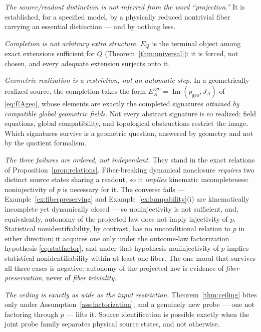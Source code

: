 \documentclass[11pt,reqno]{amsart}
\theoremstyle{plain}
\theoremstyle{definition}
\theoremstyle{remark}
\DeclareMathOperator{\Ima}{Im}
\begin{document}
\emph{The source/readout distinction is not inferred from the word ``projection.''} It is established, for a specified model, by a physically reduced nontrivial fiber carrying an essential distinction --- and by nothing less.

\emph{Completion is not arbitrary extra structure.} $E_Q$ is the terminal object among exact extensions sufficient for $Q$ (Theorem~\ref{thm:universal}): it is forced, not chosen, and every adequate extension surjects onto it.

\emph{Geometric realization is a restriction, not an automatic step.} In a geometrically realized source, the completion takes the form $E_A^{\mathrm{geo}}=\Ima(p_{\mathrm{geo}},J_A)$ of \eqref{eq:EAgeo}, whose elements are exactly the completed signatures \emph{attained by compatible global geometric fields}. Not every abstract signature is so realized: field equations, global compatibility, and topological obstructions restrict the image. Which signatures survive is a geometric question, answered by geometry and not by the quotient formalism.

\emph{The three failures are ordered, not independent.} They stand in the exact relations of Proposition~\ref{prop:relations}. Fiber-breaking dynamical nonclosure \emph{requires} two distinct source states sharing a readout, so it \emph{implies} kinematic incompleteness: noninjectivity of $p$ is necessary for it. The converse fails --- Example~\ref{ex:fiberpreserving} and Example~\ref{ex:lumpability}(i) are kinematically incomplete yet dynamically closed --- so noninjectivity is not sufficient, and, equivalently, autonomy of the projected law does not imply injectivity of $p$. Statistical nonidentifiability, by contrast, has no unconditional relation to $p$ in either direction; it acquires one only under the outcome-law factorization hypothesis \eqref{eq:statfactor}, and under that hypothesis noninjectivity of $p$ implies statistical nonidentifiability within at least one fiber. The one moral that survives all three cases is negative: autonomy of the projected law is evidence of \emph{fiber preservation}, never of \emph{fiber triviality}.

\emph{The ceiling is exactly as wide as the input restriction.} Theorem~\ref{thm:ceiling} bites only under Assumption~\ref{ass:factorization}, and a genuinely new probe --- one not factoring through $p$ --- lifts it. Source identification is possible exactly when the joint probe family separates physical source states, and not otherwise.
\end{document}
